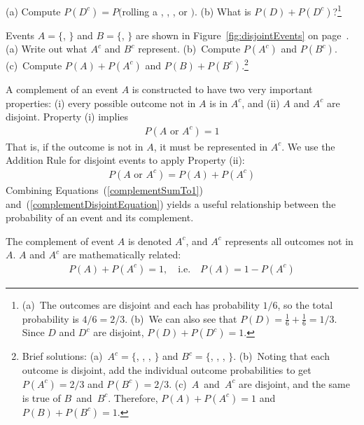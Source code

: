 \begin{exercise}
(a) Compute $P(D^c) = P($rolling a , , , or $)$. (b) What is $P(D) + P(D^c)$?\footnote{(a)~The outcomes are disjoint and each has probability $1/6$, so the total probability is $4/6=2/3$. (b)~We can also see that $P(D)=\frac{1}{6} + \frac{1}{6} = 1/3$. Since $D$ and $D^c$ are disjoint, $P(D) + P(D^c) = 1$.}
\end{exercise}

\begin{exercise}
Events $A=\{$, $\}$ and $B=\{$, $\}$ are shown in Figure~\ref{fig:disjointEvents} on page~\pageref{fig:disjointEvents}. (a) Write out what $A^c$ and $B^c$ represent. (b)~Compute $P(A^c)$ and $P(B^c)$. (c)~Compute $P(A)+P(A^c)$ and $P(B)+P(B^c)$.\footnote{Brief solutions: (a)~$A^c=\{$, , , $\}$ and $B^c=\{$, , , $\}$. (b)~Noting that each outcome is disjoint, add the individual outcome probabilities to get $P(A^c)=2/3$ and $P(B^c)=2/3$. (c)~$A$~and~$A^c$ are disjoint, and the same is true of $B$~and~$B^c$. Therefore, $P(A) + P(A^c) = 1$ and $P(B) + P(B^c) = 1$.}
\end{exercise}

A complement of an event $A$ is constructed to have two very important properties: (i) every possible outcome not in $A$ is in $A^c$, and (ii) $A$ and $A^c$ are disjoint. Property (i) implies
\begin{eqnarray}
P(A\text{ or }A^c) = 1
\label{complementSumTo1}
\end{eqnarray}
That is, if the outcome is not in $A$, it must be represented in $A^c$. We use the Addition Rule for disjoint events to apply Property (ii):
\begin{eqnarray}
P(A\text{ or }A^c) = P(A) + P(A^c)
\label{complementDisjointEquation}
\end{eqnarray}
Combining Equations~(\ref{complementSumTo1}) and~(\ref{complementDisjointEquation}) yields a useful relationship between the probability of an event and its complement.

\begin{termBox}{
The complement of event $A$ is denoted $A^c$, and $A^c$ represents all outcomes not in~$A$. $A$ and $A^c$ are mathematically related: \vspace{-2mm}
\begin{eqnarray}\label{complement}
P(A) + P(A^c) = 1, \quad\text{i.e.}\quad P(A) = 1-P(A^c)
\end{eqnarray}\vspace{-6.5mm}}
\end{termBox}

